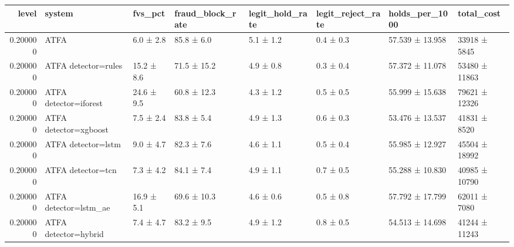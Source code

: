 \begin{tabular}{rlllllll}
\toprule
level & system & fvs\_pct & fraud\_block\_rate & legit\_hold\_rate & legit\_reject\_rate & holds\_per\_1000 & total\_cost \\
\midrule
0.200000 & ATFA & 6.0 ± 2.8 & 85.8 ± 6.0 & 5.1 ± 1.2 & 0.4 ± 0.3 & 57.539 ± 13.958 & 33918 ± 5845 \\
0.200000 & ATFA detector=rules & 15.2 ± 8.6 & 71.5 ± 15.2 & 4.9 ± 0.8 & 0.3 ± 0.4 & 57.372 ± 11.078 & 53480 ± 11863 \\
0.200000 & ATFA detector=iforest & 24.6 ± 9.5 & 60.8 ± 12.3 & 4.3 ± 1.2 & 0.5 ± 0.5 & 55.999 ± 15.638 & 79621 ± 12326 \\
0.200000 & ATFA detector=xgboost & 7.5 ± 2.4 & 83.8 ± 5.4 & 4.9 ± 1.3 & 0.6 ± 0.3 & 53.476 ± 13.537 & 41831 ± 8520 \\
0.200000 & ATFA detector=lstm & 9.0 ± 4.7 & 82.3 ± 7.6 & 4.6 ± 1.1 & 0.5 ± 0.4 & 55.985 ± 12.927 & 45504 ± 18992 \\
0.200000 & ATFA detector=tcn & 7.3 ± 4.2 & 84.1 ± 7.4 & 4.9 ± 1.1 & 0.7 ± 0.5 & 55.288 ± 10.830 & 40985 ± 10790 \\
0.200000 & ATFA detector=lstm\_ae & 16.9 ± 5.1 & 69.6 ± 10.3 & 4.6 ± 0.6 & 0.5 ± 0.8 & 57.792 ± 17.799 & 62011 ± 7080 \\
0.200000 & ATFA detector=hybrid & 7.4 ± 4.7 & 83.2 ± 9.5 & 4.9 ± 1.2 & 0.8 ± 0.5 & 54.513 ± 14.698 & 41244 ± 11243 \\
\bottomrule
\end{tabular}
